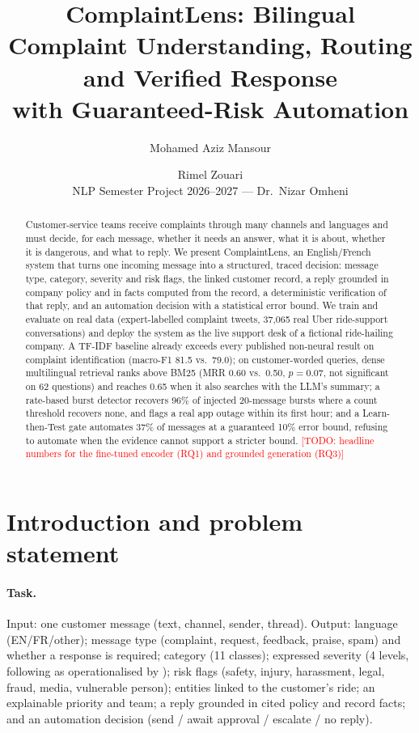 \documentclass[11pt,a4paper]{article}
\title{ComplaintLens: Bilingual Complaint Understanding, Routing and Verified Response\\
with Guaranteed-Risk Automation}
\author{Mohamed Aziz Mansour \and Rimel Zouari\\[2pt]
\small NLP Semester Project 2026--2027 --- Dr.\ Nizar Omheni}
\date{\todo{submission date}}
\newcommand{\todo}[1]{\textcolor{red}{[TODO: #1]}}
\begin{document}
\maketitle

\begin{abstract}
Customer-service teams receive complaints through many channels and languages and must decide, for
each message, whether it needs an answer, what it is about, whether it is dangerous, and what to
reply. We present ComplaintLens, an English/French system that turns one incoming message into a
structured, traced decision: message type, category, severity and risk flags, the linked customer
record, a reply grounded in company policy and in facts computed from the record, a deterministic
verification of that reply, and an automation decision with a statistical error bound. We train and
evaluate on real data (expert-labelled complaint tweets, 37{,}065 real Uber ride-support conversations)
and deploy the system as the live support desk of a fictional ride-hailing company.
A TF-IDF baseline already exceeds every published non-neural result on complaint identification
(macro-F1 81.5 vs.\ 79.0); on customer-worded queries, dense multilingual retrieval ranks above
BM25 (MRR 0.60 vs.\ 0.50, $p=0.07$, not significant on 62 questions) and reaches 0.65 when it also
searches with the LLM's summary; a rate-based burst detector
recovers 96\% of injected 20-message bursts where a count threshold recovers none, and flags a real
app outage within its first hour; and a Learn-then-Test gate automates 37\% of messages at a
guaranteed 10\% error bound, refusing to automate when the evidence cannot support a stricter bound.
\todo{headline numbers for the fine-tuned encoder (RQ1) and grounded generation (RQ3)}
\end{abstract}

\section{Introduction and problem statement}
\label{sec:intro}
\paragraph{Task.} Input: one customer message (text, channel, sender, thread). Output: language
(EN/FR/other); message type (complaint, request, feedback, praise, spam) and whether a response is
required; category (11 classes); expressed severity (4 levels, following \citet{trosborg1995pragmatics}
as operationalised by \citet{jin2021severity}); risk flags (safety, injury, harassment, legal, fraud,
media, vulnerable person); entities linked to the customer's ride; an explainable priority
and team; a reply grounded in cited policy and record facts; and an automation decision
(send / await approval / escalate / no reply).
\end{document}
